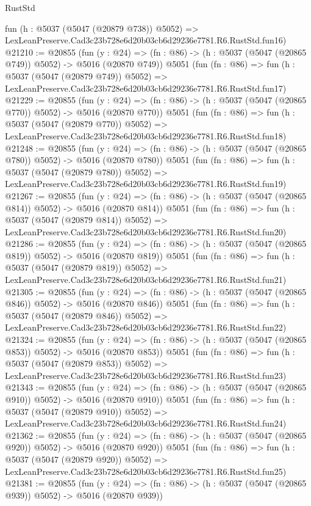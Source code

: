 \begin{lexlean}{RustStd}
\begin{coremodule}
    fun (h : @5037 (@5047 (@20879 @738)) @5052) =>
    LexLeanPreserve.Cad3c23b728e6d20b03cb6d29236e7781.R6.RustStd.fun16)
@21210 := @20855
    (fun (y : @24) => (fn : @86) -> (h : @5037 (@5047 (@20865 @749)) @5052) -> @5016 (@20870 @749))
    @5051
    (fun (fn : @86) =>
    fun (h : @5037 (@5047 (@20879 @749)) @5052) =>
    LexLeanPreserve.Cad3c23b728e6d20b03cb6d29236e7781.R6.RustStd.fun17)
@21229 := @20855
    (fun (y : @24) => (fn : @86) -> (h : @5037 (@5047 (@20865 @770)) @5052) -> @5016 (@20870 @770))
    @5051
    (fun (fn : @86) =>
    fun (h : @5037 (@5047 (@20879 @770)) @5052) =>
    LexLeanPreserve.Cad3c23b728e6d20b03cb6d29236e7781.R6.RustStd.fun18)
@21248 := @20855
    (fun (y : @24) => (fn : @86) -> (h : @5037 (@5047 (@20865 @780)) @5052) -> @5016 (@20870 @780))
    @5051
    (fun (fn : @86) =>
    fun (h : @5037 (@5047 (@20879 @780)) @5052) =>
    LexLeanPreserve.Cad3c23b728e6d20b03cb6d29236e7781.R6.RustStd.fun19)
@21267 := @20855
    (fun (y : @24) => (fn : @86) -> (h : @5037 (@5047 (@20865 @814)) @5052) -> @5016 (@20870 @814))
    @5051
    (fun (fn : @86) =>
    fun (h : @5037 (@5047 (@20879 @814)) @5052) =>
    LexLeanPreserve.Cad3c23b728e6d20b03cb6d29236e7781.R6.RustStd.fun20)
@21286 := @20855
    (fun (y : @24) => (fn : @86) -> (h : @5037 (@5047 (@20865 @819)) @5052) -> @5016 (@20870 @819))
    @5051
    (fun (fn : @86) =>
    fun (h : @5037 (@5047 (@20879 @819)) @5052) =>
    LexLeanPreserve.Cad3c23b728e6d20b03cb6d29236e7781.R6.RustStd.fun21)
@21305 := @20855
    (fun (y : @24) => (fn : @86) -> (h : @5037 (@5047 (@20865 @846)) @5052) -> @5016 (@20870 @846))
    @5051
    (fun (fn : @86) =>
    fun (h : @5037 (@5047 (@20879 @846)) @5052) =>
    LexLeanPreserve.Cad3c23b728e6d20b03cb6d29236e7781.R6.RustStd.fun22)
@21324 := @20855
    (fun (y : @24) => (fn : @86) -> (h : @5037 (@5047 (@20865 @853)) @5052) -> @5016 (@20870 @853))
    @5051
    (fun (fn : @86) =>
    fun (h : @5037 (@5047 (@20879 @853)) @5052) =>
    LexLeanPreserve.Cad3c23b728e6d20b03cb6d29236e7781.R6.RustStd.fun23)
@21343 := @20855
    (fun (y : @24) => (fn : @86) -> (h : @5037 (@5047 (@20865 @910)) @5052) -> @5016 (@20870 @910))
    @5051
    (fun (fn : @86) =>
    fun (h : @5037 (@5047 (@20879 @910)) @5052) =>
    LexLeanPreserve.Cad3c23b728e6d20b03cb6d29236e7781.R6.RustStd.fun24)
@21362 := @20855
    (fun (y : @24) => (fn : @86) -> (h : @5037 (@5047 (@20865 @920)) @5052) -> @5016 (@20870 @920))
    @5051
    (fun (fn : @86) =>
    fun (h : @5037 (@5047 (@20879 @920)) @5052) =>
    LexLeanPreserve.Cad3c23b728e6d20b03cb6d29236e7781.R6.RustStd.fun25)
@21381 := @20855
    (fun (y : @24) => (fn : @86) -> (h : @5037 (@5047 (@20865 @939)) @5052) -> @5016 (@20870 @939))

\end{coremodule}
\end{lexlean}

